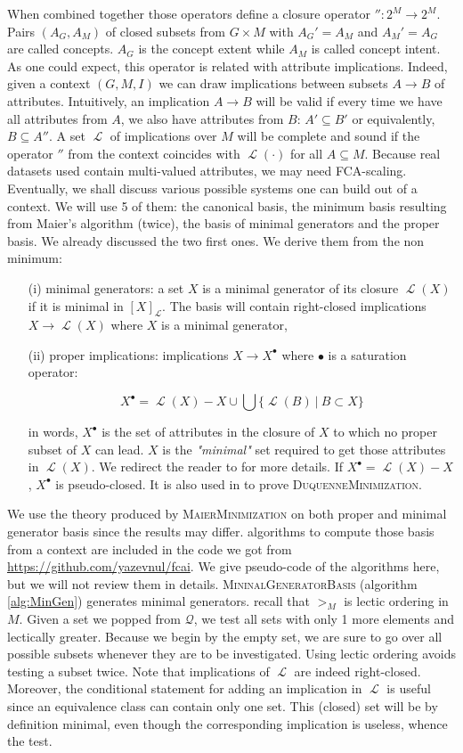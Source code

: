 \documentclass[runningheads]{llncs}
\DeclareMathOperator{\I}{\mathcal{L}}  %
\DeclareMathOperator{\imp}{\longrightarrow} %
\begin{document}
When combined together those operators define a closure operator $'': 2^M \imp 2^M$. Pairs $(A_G, A_M)$ of closed subsets from $G \times M$ with $A_G' = A_M$ and $A_M' = A_G$ are called concepts. $A_G$ is the concept extent while $A_M$ is called concept intent. As one could expect, this operator is related with attribute implications. Indeed, given a context $(G, M, I)$ we can draw implications between subsets $A \imp B$ of attributes. Intuitively, an implication $A \imp B$ will be valid if every time we have all attributes from $A$, we also have attributes from $B$: $A' \subseteq B'$ or equivalently, $B \subseteq A''$. A set $\I$ of implications over $M$ will be complete and sound if the operator $''$ from the context coincides with $\I(\cdot)$ for all $A \subseteq M$. Because real datasets used contain multi-valued attributes, we may need FCA-scaling. Eventually, we shall discuss various possible systems one can build out of a context. We will use 5 of them: the canonical basis, the minimum basis resulting from Maier's algorithm (twice), the basis of minimal generators and the proper basis. We already discussed the two first ones. We derive them from the non minimum:
\begin{itemize}
	\item[(i)] minimal generators: a set $X$ is a minimal generator of its closure $\I(X)$ if it is minimal in $[ X]_{\I}$. The basis will contain
	right-closed implications $X \imp \I(X)$ where $X$ is a minimal generator,
	\item[(ii)] proper implications: implications $X \imp X^{\bullet}$ where 
	$\bullet$ is a saturation operator:
	
	\[ X^{\bullet} = \I(X) - X \cup \bigcup \{ \I(B) \ | \ B \subset X \} \]
	
	in words, $X^{\bullet}$ is the set of attributes in the closure of $X$ to
	which no proper subset of $X$ can lead. $X$ is the \textit{"minimal"} set required to get those attributes in $\I(X)$. We redirect the reader to 
	\cite{ganter_conceptual_2016} for more details. If $X^{\bullet} = \I(X) - X$, $X^{\bullet}$ is pseudo-closed.	It is also used in \cite{duquenne_variations_2007} to prove \textsc{DuquenneMinimization}.
\end{itemize}
We use the theory produced by \textsc{MaierMinimization} on both proper and minimal generator basis since the results may differ. algorithms to compute those basis from a context are included in the code we got from \url{https://github.com/yazevnul/fcai}. We give pseudo-code of the algorithms here, but we will not review them in details. \textsc{MininalGeneratorBasis} (algorithm \ref{alg:MinGen}) generates minimal 
generators. recall that $>_{M}$ is lectic ordering in $M$. Given a set we popped
from $\mathcal{Q}$, we test all sets with only 1 more elements and lectically
greater. Because we begin by the empty set, we are sure to go over all possible
subsets whenever they are to be investigated. Using lectic ordering avoids testing a subset twice. Note that implications of $\I$ are indeed right-closed.
Moreover, the conditional statement for adding an implication in $\I$ is useful
since an equivalence class can contain only one set. This (closed) set will
be by definition minimal, even though the corresponding implication is useless,
whence the test.
\end{document}
